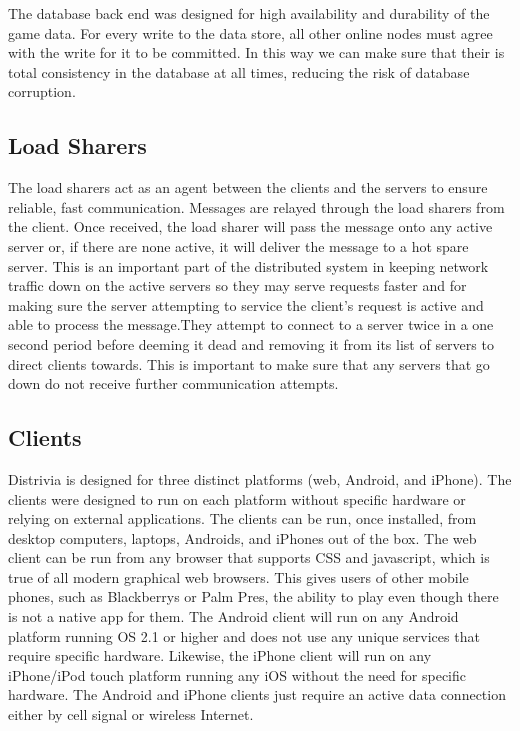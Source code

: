 \documentclass{dependencies/acm_proc_article-sp}
\begin{document}
The database back end was designed for high availability and durability of the game data. For every write to the data store, all other online nodes must agree with the write for it to be committed. In this way we can make sure that their is total consistency in the database at all times, reducing the risk of database corruption. 

\subsection{Load Sharers}
The load sharers act as an agent between the clients and the servers to ensure reliable, fast communication. Messages are relayed through the load sharers from the client. Once received, the load sharer will pass the message onto any active server or, if there are none active, it will deliver the message to a hot spare server. This is an important part of the distributed system in keeping network traffic down on the active servers so they may serve requests faster and for making sure the server attempting to service the client's request is active and able to process the message.They attempt to connect to a server twice in a one second period before deeming it dead and removing it from its list of servers to direct clients towards. This is important to make sure that any servers that go down do not receive further communication attempts.


\subsection{Clients}
Distrivia is designed for three distinct platforms (web, Android, and iPhone).
The clients were designed to run on each platform without specific hardware or relying on external applications.
The clients can be run, once installed, from desktop computers, laptops, Androids, and iPhones out of the box.
The web client can be run from any browser that supports CSS and javascript, which is true of all modern graphical web browsers. This gives users of other mobile phones, such as Blackberrys or Palm Pres, the ability to play even though there is not a native app for them. The Android client will run on any Android platform running OS 2.1 or higher and does not use any unique services that require specific hardware. Likewise, the iPhone client will run on any iPhone/iPod touch platform running any iOS without the need for specific hardware. The Android and iPhone clients just require an active data connection either by cell signal or wireless Internet.
\end{document}
